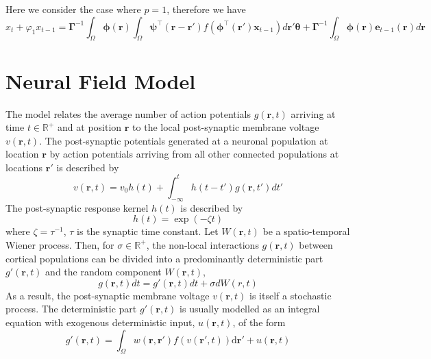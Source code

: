 \documentclass[11pt,draftcls,onecolumn,peerreview]{IEEEtran}
\begin{document}
Here we consider the case where $p=1$, therefore we have
\begin{equation}
x_t+\varphi_{1} x_{t-1}=\boldsymbol\Gamma^{-1}\int_{\Omega}\boldsymbol \phi(\mathbf r)\int_{\Omega}\boldsymbol{\psi}^\top\left(\mathbf{r}-\mathbf{r}'\right) f(\boldsymbol{\phi}^{\top}\left(\mathbf{r'}\right) \mathbf{x}_{t-1})d\mathbf r'\boldsymbol{\theta}+\boldsymbol\Gamma^{-1}\int_{\Omega}\boldsymbol\phi(\mathbf r)\mathbf e_{t-1}(\mathbf r)d\mathbf r
\end{equation}
\section{Neural Field Model}
The model relates the average number of action potentials $g(\mathbf{r},t)$ arriving at time $t \in \mathbb R^{+}$ and at position $\mathbf{r}$ to the local post-synaptic membrane voltage $v(\mathbf{r},t)$. The post-synaptic potentials generated at a neuronal population at location $\mathbf{r}$ by action potentials arriving from all other connected populations at locations $\mathbf{r}'$ is described by 
\begin{equation}
	\label{eq:SpikesToPotential} v\left( {\mathbf{r},t} \right)=v_0h(t)+\int_{ - \infty }^t {h\left( {t - t'} \right)g\left( {\mathbf{r},t'} \right)dt'}
\end{equation}
The post-synaptic response kernel $h(t)$ is described by 
\begin{equation}
	\label{eq:SynapticRespKernel} h(t) = \exp{\left(-\zeta t\right)} 
\end{equation}
where $\zeta=\tau^{-1}$, $\tau$ is the synaptic time constant.
Let $W(\mathbf r,t)$ be a spatio-temporal Wiener process. Then, for $\sigma \in \mathbb R^{+}$, the non-local interactions $g\left( {\mathbf{r},t} \right)$ between cortical populations can be divided into a predominantly deterministic part $g'\left( {\mathbf{r},t} \right) $ and  the random component $W(\mathbf r,t)$,
\begin{equation}\label{eq:ActPotComponents}
  g\left( {\mathbf{r},t} \right)dt=g'\left( {\mathbf{r},t} \right)dt+\sigma d W(r,t)
\end{equation}
As a result, the post-synaptic membrane voltage $v(\mathbf r, t)$ is itself a stochastic process. The deterministic part $g'(\mathbf r, t)$ is usually modelled as an integral equation with exogenous deterministic input, $ u(\mathbf r,t)$, of the form
\begin{equation}
	\label{DeterministicRateBasedInteractions} g'\left( \mathbf{r},t \right) = \int_\Omega {w\left( \mathbf{r},\mathbf{r}' \right)f\left( v\left( \mathbf{r}',t \right) \right)\textrm{d}\mathbf{r}'}+u(\mathbf r,t)
\end{equation}
\end{document}
